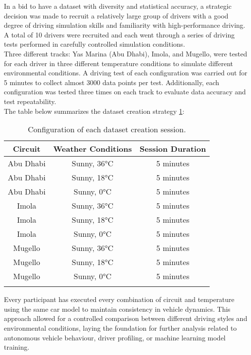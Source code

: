 \documentclass[a4paper,final,12pt]{report}
\begin{document}
In a bid to have a dataset with diversity and statistical accuracy, a strategic decision was made to recruit a relatively large group of drivers with a good degree of driving simulation skills and familiarity with high-performance driving. A total of 10 drivers were recruited and each went through a series of driving tests performed in carefully controlled simulation conditions.\\

Three different tracks: Yas Marina (Abu Dhabi), Imola, and Mugello, were tested for each driver in three different temperature conditions to simulate different environmental conditions. A driving test of each configuration was carried out for 5 minutes to collect almost 3000 data points per test. Additionally, each configuration was tested three times on each track to evaluate data accuracy and test repeatability.\\

The table below summarizes the dataset creation strategy \ref{tab:dataset_config}:

\newpage
\begin{longtable}{|c|c|c|}
\hline
\textbf{Circuit} & \textbf{Weather Conditions} & \textbf{Session Duration} \\
\hline
Abu Dhabi & Sunny, 36°C & 5 minutes \\
Abu Dhabi & Sunny, 18°C & 5 minutes \\
Abu Dhabi & Sunny, 0°C  & 5 minutes \\
\hline
Imola & Sunny, 36°C & 5 minutes \\
Imola & Sunny, 18°C & 5 minutes \\
Imola & Sunny, 0°C  & 5 minutes \\
\hline
Mugello & Sunny, 36°C & 5 minutes \\
Mugello & Sunny, 18°C & 5 minutes \\
Mugello & Sunny, 0°C  & 5 minutes \\
\hline
\caption{Configuration of each dataset creation session.}
\label{tab:dataset_config}
\end{longtable}

Every participant has executed every combination of circuit and temperature  using the same car model to maintain consistency in vehicle dynamics. This approach allowed for a controlled comparison between different driving styles and environmental conditions, laying the foundation for further analysis related to autonomous vehicle behaviour, driver profiling, or machine learning model training.
\end{document}
